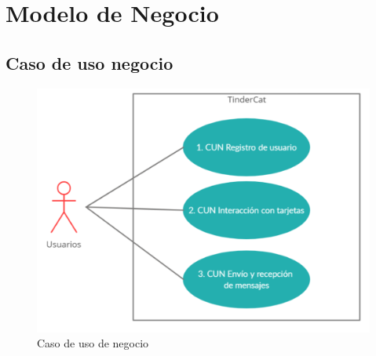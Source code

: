 \documentclass{article}
\begin{document}
\onehalfspacing    


\clearpage
\tableofcontents
\clearpage 
\section{Modelo de Negocio}
\subsection{Caso de uso negocio}
\vspace{5mm}
\begin{figure}[h]
    \begin{center}
        \includegraphics[width=\textwidth]{images/Caso de uso negocio.png}
        \caption{Caso de uso de negocio}
    \end{center}
\end{figure}    
\end{document}
